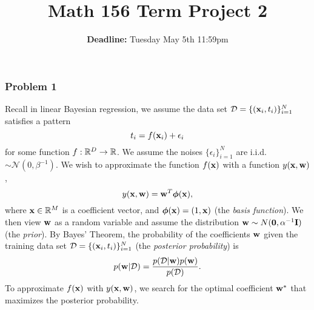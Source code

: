 \documentclass[12pt,a4paper]{article}
\renewcommand{\v}[1]{\ifmmode\mathbf{#1}\fi}
\newcommand{\ra}[1]{\ifnum #1=1\rightarrow\fi\ifnum #1=2\Rightarrow\fi\ifnum #1=3\Rrightarrow\fi\ifnum #1=4\rightrightarrows\fi\ifnum #1=5\rightleftarrows\fi\ifnum #1=6\mapsto\fi\ifnum #1=7\iffalse\fi\fi\ifnum #1=8\twoheadrightarrow\fi\ifnum #1=9\rightharpoonup\fi\ifnum #1=0\rightharpoondown\fi}
\newcommand{\R}{\ifmmode\mathbb R\fi}
\begin{document}
\title{Math 156 Term Project 2}
\author{\textbf{Deadline:} Tuesday May 5th 11:59pm}
\date{}
\maketitle

\subsubsection*{Problem 1}
Recall in linear Bayesian regression, we assume the data set $\mathcal D = \{ (\v x_i, t_i) \}_{i=1}^N$ satisfies a pattern
\begin{equation*}
t_i = f(\v x_i) + \epsilon_i
\end{equation*}
for some function $f: \R^D \ra1 \R$. We assume the noises $\{\epsilon_i\}_{i=1}^N$ are i.i.d. $\sim \mathcal N(0, \beta^{-1})$. 
We wish to approximate the function $f(\v x)$ with a function $y(\v x, \v w)$,
\begin{equation*}
y(\v x, \v w) = \v w^T \boldsymbol\phi(\v x),
\end{equation*}
where $\v x\in \R^M$ is a coefficient vector, and $\boldsymbol\phi(\v x) = (1, \v x)$ (the \textit{basis function}). We then view $\v w$ as a random variable and assume the distribution $\v w \sim N(\mathbf 0, \alpha^{-1}\mathbf I)$ (the \textit{prior}). By Bayes' Theorem, the probability of the coefficients $\v w$ given the training data set $\mathcal D = \{ (\v x_i, t_i) \}_{i=1}^N$ (the \textit{posterior probability}) is 
\begin{equation}
p(\v w \vert \mathcal D) = \frac{p(\mathcal D \vert \v w) p(\v w)}{p(\mathcal D)}.
\label{posterior}
\end{equation}
To approximate $f(\v x)$ with $y(\v x, \v w)$, we search for the optimal coefficient $\v w^\ast$ that maximizes the posterior probability. 
\end{document}
